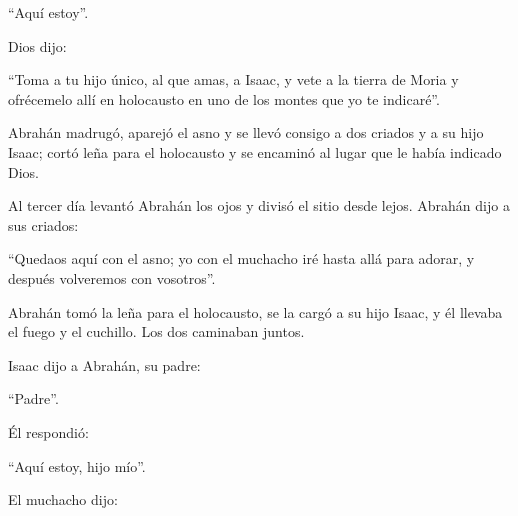 			\begin{readtalk}“Aquí estoy”. \end{readtalk}
			
			\begin{readbody}Dios dijo: \end{readbody}
			
			\begin{readtalk}“Toma a tu hijo único, al que amas, a Isaac, y vete a la tierra de Moria y ofrécemelo allí en holocausto en uno de los montes que yo te indicaré”. \end{readtalk}
			
			\begin{readbody}Abrahán madrugó, aparejó el asno y se llevó consigo a dos criados y a su hijo Isaac; cortó leña para el holocausto y se encaminó al lugar que le había indicado Dios. \end{readbody}
			
			\begin{readbody}Al tercer día levantó Abrahán los ojos y divisó el sitio desde lejos. Abrahán dijo a sus criados: \end{readbody}
			
			\begin{readtalk}“Quedaos aquí con el asno; yo con el muchacho iré hasta allá para adorar, y después volveremos con vosotros”. \end{readtalk}
			
			\begin{readbody}Abrahán tomó la leña para el holocausto, se la cargó a su hijo Isaac, y él llevaba el fuego y el cuchillo. Los dos caminaban juntos. \end{readbody}
			
			\begin{readbody}Isaac dijo a Abrahán, su padre: \end{readbody}
			
			\begin{readtalk}“Padre”. \end{readtalk}
			
			\begin{readbody}Él respondió: \end{readbody}
			
			\begin{readtalk}“Aquí estoy, hijo mío”. \end{readtalk}
			
			\begin{readbody}El muchacho dijo: \end{readbody}
			
